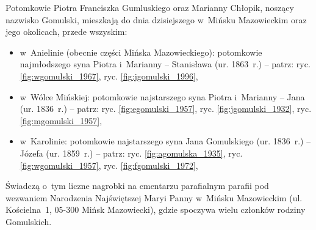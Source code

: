Potomkowie Piotra Franciszka Gumluskiego oraz Marianny Chłopik, noszący
nazwisko Gomulski, mieszkają do dnia dzisiejszego w~Mińsku Mazowieckim oraz
jego okolicach, przede wszyskim:

\begin{itemize}
    \item w~Anielinie (obecnie części Mińska Mazowieckiego): potomkowie
    najmłodszego syna Piotra i~Marianny -- Stanisława (ur. 1863~r.) -- patrz:
    ryc. \ref{fig:wgomulski_1967}, ryc. \ref{fig:jgomulski_1996},
    \item w~Wólce Mińskiej: potomkowie najstarszego syna Piotra i~Marianny --
    Jana (ur. 1836~r.) -- patrz:  ryc. \ref{fig:egomulski_1957},
    ryc. \ref{fig:jgomulski_1932}, ryc. \ref{fig:mgomulski_1957},
    \item w~Karolinie: potomkowie najstarszego syna Jana Gomulskiego
    (ur. 1836~r.) -- Józefa (ur. 1859~r.) -- patrz: ryc. 
    \ref{fig:agomulska_1935}, ryc. \ref{fig:wgomulski_1957}, ryc.
    \ref{fig:fgomulski_1972},
  \end{itemize}

Świadczą o~tym liczne nagrobki na cmentarzu parafialnym parafii pod wezwaniem
Narodzenia Najświętszej Maryi Panny w~Mińsku Mazowieckim (ul. Kościelna~1,
05-300 Mińsk Mazowiecki), gdzie spoczywa wielu członków rodziny Gomulskich.